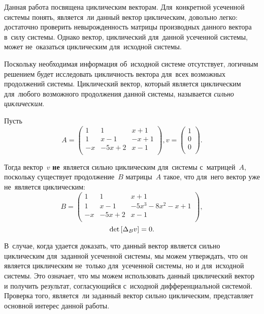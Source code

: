 Данная работа посвящена циклическим векторам.
Для~конкретной усеченной системы понять, является~ли данный вектор циклическим, довольно легко:
достаточно проверить невырожденность матрицы производных данного вектора в~силу системы.
Однако вектор, циклический для~данной усеченной системы, может не~оказаться циклическим для~исходной системы.

\newpage
Поскольку необходимая информация об~исходной системе отсутствует,
логичным решением будет исследовать цикличность вектора для~всех возможных продолжений системы.
Циклический вектор, который является циклическим для~любого возможного продолжения данной системы,
называется \emph{сильно циклическим}.

\begin{example}
Пусть
	\begin{equation*}
		A = 
		\begin{pmatrix}
			1 & 1 & x + 1 \\
			1 & x - 1 & -x + 1 \\
			-x & -5x + 2 & x - 1 \\
		\end{pmatrix},
		v =
		\begin{pmatrix}
			1 \\
			0 \\
			0 \\
		\end{pmatrix}.
	\end{equation*}
    
	Тогда вектор~$v$ \textbf{не}~является сильно циклическим для~системы с~матрицей~$A$,
    поскольку существует продолжение~$B$ матрицы~$A$ такое,
    что для~него вектор уже не~является циклическим:
	\begin{equation*}
		B = 
		\begin{pmatrix}
			1 & 1 & x + 1 \\
			1 & x - 1 & -5x^3 -8x^2 -x + 1 \\
			-x & -5x + 2 & x - 1 \\
		\end{pmatrix},
	\end{equation*}
    \begin{equation*}
		\mathop{\rm det}\text{$ [\Delta_B v] $} = 0.
	\end{equation*}
\end{example}

В~случае, когда удается доказать, что данный вектор является сильно циклическим для~заданной усеченной системы,
мы можем утверждать, что он является циклическим не~только для~усеченной системы, но и для~исходной системы.
Это означает, что мы можем использовать данный циклический вектор и получить результат,
согласующийся с~исходной дифференциальной системой.
Проверка того, является~ли заданный вектор сильно циклическим, представляет основной интерес данной работы.
